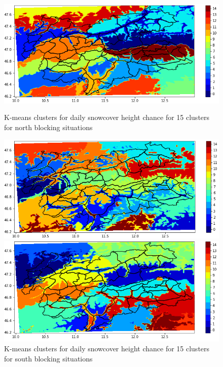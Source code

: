 \begin{figure}[ht] 
    \label{ fig7} 
    \begin{minipage}[b]{0.48\linewidth}
      \centering
      \includegraphics[width=0.9\linewidth]{Figures/figures_snowgrid/15_N_S_W_U/clusters_analysis_north15.png} 
      \caption{K-means clusters for daily snowcover height chance for  15 clusters for 
      north blocking situations} 
      \vspace{4ex}
      \hspace{4ex}
    \end{minipage}%
    \begin{minipage}[b]{0.48\linewidth}
      \centering
      \includegraphics[width=0.9\linewidth]{Figures/figures_snowgrid/15_N_S_W_U/clusters_analysis_south15.png} 
      \caption{K-means clusters for daily snowcover height chance for  15 clusters for 
      south blocking situations} 
      \vspace{4ex}
      \hspace{4ex}
    \end{minipage} 
    \begin{minipage}[b]{0.48\linewidth}
      \centering
      \includegraphics[width=0.9\linewidth]{Figures/figures_snowgrid/15_N_S_W_U/clusters_analysis_west_15.png} 

\end{minipage}
\end{figure}
